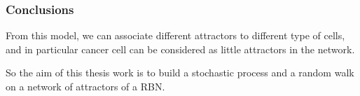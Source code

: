 \documentclass{beamer}
\begin{document}
\begin{frame}
\frametitle{Conclusions}
From this model, we can associate different attractors to different type of cells, and in particular cancer cell can be considered as little attractors in the network.


So the aim of this thesis work is to build a stochastic process and a random walk on a network of attractors of a RBN.



\end{frame}
\end{document}
